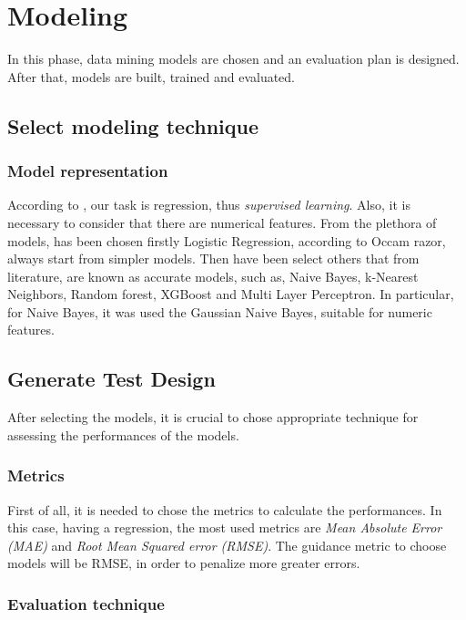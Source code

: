 \section{Modeling}

In this phase, data mining models are chosen and an evaluation plan is designed. After that, models are built, trained and evaluated.
\subsection{Select modeling technique}

\subsubsection{Model representation}

According to , our task is regression, thus \textit{supervised learning}. Also, it is necessary to consider that there are numerical features. From the plethora of models, has been chosen firstly Logistic Regression, according to Occam razor, always start from simpler models. Then have been select others that from literature, are known as accurate models, such as, Naive Bayes, k-Nearest Neighbors, Random forest, XGBoost and Multi Layer Perceptron. 
In particular, for Naive Bayes, it was used the Gaussian Naive Bayes, suitable for numeric features.


\subsection{Generate Test Design}

After selecting the models, it is crucial to chose appropriate technique for assessing the performances of the models.

\subsubsection{Metrics}

First of all, it is needed to chose the metrics to calculate the performances. In this case, having a regression, the most used metrics are \textit{Mean Absolute Error (MAE)} and \textit{Root Mean Squared error (RMSE)}. The guidance metric to choose models will be RMSE, in order to penalize more greater errors.

\subsubsection{Evaluation technique}

